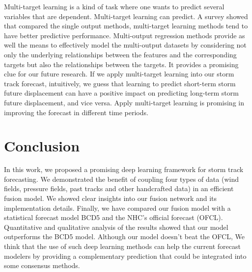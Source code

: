 Multi-target learning is a kind of task where one wants to predict several variables that are dependent. Multi-target learning can predict. A survey showed that compared the single output methods, multi-target learning methods tend to have better predictive performance. Multi-output regression methods provide as well the means to effectively model the multi-output datasets by considering not only the underlying relationships between the features and the corresponding targets but also the relationships between the targets. It provides a promising clue for our future research. If we apply multi-target learning into our storm track forecast, intuitively, we guess that learning to predict short-term storm future displacement can have a positive impact on predicting long-term storm future displacement, and vice versa. Apply multi-target learning is promising in improving the forecast in different time periods.

\section{Conclusion}
In this work, we proposed a promising deep learning framework for storm track forecasting. We demonstrated the benefit of coupling four types of data (wind fields, pressure fields, past tracks and other handcrafted data) in an efficient fusion model. We showed clear insights into our fusion network and its implementation details. Finally, we have compared our fusion model with a statistical forecast model BCD5 and the NHC's official forecast (OFCL). Quantitative and qualitative analysis of the results showed that our model outperforms the BCD5 model. Although our model doesn't beat the OFCL, We think that the use of such deep learning methods can help the current forecast modelers by providing a complementary prediction that could be integrated into some consensus methods.



